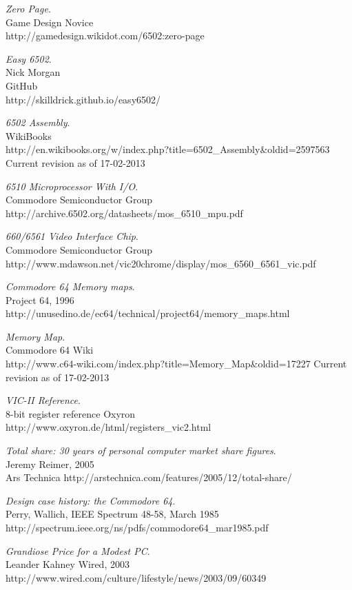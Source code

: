 \documentclass{article}
\begin{document}
\begin{thebibliography}{9}
   \emph{Zero Page}.\\
   Game Design Novice\\
   http://gamedesign.wikidot.com/6502:zero-page
   
   \emph{Easy 6502}.\\
   Nick Morgan \\
   GitHub \\
   http://skilldrick.github.io/easy6502/
   
   \emph{6502 Assembly}.\\
   WikiBooks\\
   http://en.wikibooks.org/w/index.php?title=6502\_Assembly\&oldid=2597563 \\
   Current revision as of 17-02-2013
   
   \emph{6510 Microprocessor With I/O}.\\
   Commodore Semiconductor Group \\
   http://archive.6502.org/datasheets/mos\_6510\_mpu.pdf
   
   \emph{660/6561 Video Interface Chip}.\\
   Commodore Semiconductor Group \\
  http://www.mdawson.net/vic20chrome/display/mos\_6560\_6561\_vic.pdf
   
   \emph{Commodore 64 Memory maps}.\\
   Project 64, 1996\\
   http://unusedino.de/ec64/technical/project64/memory\_maps.html
      
   \emph{Memory Map}.\\
   Commodore 64 Wiki \\
   http://www.c64-wiki.com/index.php?title=Memory\_Map\&oldid=17227
   Current revision as of 17-02-2013
      
\bibitem{}
   \emph{VIC-II Reference}.\\
   8-bit register reference
   Oxyron \\
   http://www.oxyron.de/html/registers\_vic2.html
  
   \emph{Total share: 30 years of personal computer market share figures}.\\
   Jeremy Reimer, 2005 \\
   Ars Technica
   http://arstechnica.com/features/2005/12/total-share/
     
   \emph{Design case history: the Commodore 64}.\\
   Perry, Wallich,
   IEEE Spectrum 48-58, March 1985\\
   http://spectrum.ieee.org/ns/pdfs/commodore64\_mar1985.pdf
     
   \emph{Grandiose Price for a Modest PC}.\\
   Leander Kahney
   Wired, 2003
   http://www.wired.com/culture/lifestyle/news/2003/09/60349
   
\end{thebibliography}
\end{document}
